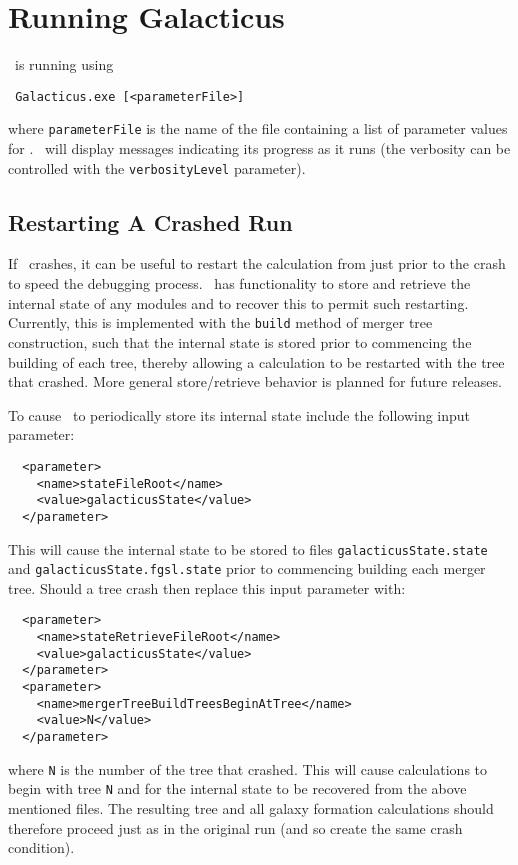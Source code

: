 \section{Running Galacticus}

\glc\ is running using
\begin{verbatim}
 Galacticus.exe [<parameterFile>]
\end{verbatim}
where {\tt parameterFile} is the name of the file containing a list of parameter values for \glc. \glc\ will display messages indicating its progress as it runs (the verbosity can be controlled with the {\tt verbosityLevel} parameter).

\subsection{Restarting A Crashed Run}\label{sec:Restarting}

If \glc\ crashes, it can be useful to restart the calculation from just prior to the crash to speed the debugging process. \glc\ has functionality to store and retrieve the internal state of any modules and to recover this to permit such restarting. Currently, this is implemented with the {\tt build} method of merger tree construction, such that the internal state is stored prior to commencing the building of each tree, thereby allowing a calculation to be restarted with the tree that crashed. More general store/retrieve behavior is planned for future releases.

To cause \glc\ to periodically store its internal state include the following input parameter:
\begin{verbatim}
  <parameter>
    <name>stateFileRoot</name>
    <value>galacticusState</value>
  </parameter>
\end{verbatim}
This will cause the internal state to be stored to files {\tt galacticusState.state} and {\tt galacticusState.fgsl.state} prior to commencing building each merger tree. Should a tree crash then replace this input parameter with:
\begin{verbatim}
  <parameter>
    <name>stateRetrieveFileRoot</name>
    <value>galacticusState</value>
  </parameter>
  <parameter>
    <name>mergerTreeBuildTreesBeginAtTree</name>
    <value>N</value>
  </parameter>
\end{verbatim}
where {\tt N} is the number of the tree that crashed. This will cause calculations to begin with tree {\tt N} and for the internal state to be recovered from the above mentioned files. The resulting tree and all galaxy formation calculations should therefore proceed just as in the original run (and so create the same crash condition).

